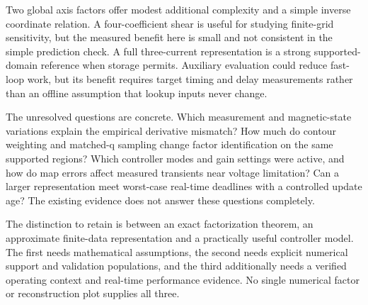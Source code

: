 Two global axis factors offer modest additional complexity and a simple inverse coordinate relation. A four-coefficient shear is useful for studying finite-grid sensitivity, but the measured benefit here is small and not consistent in the simple prediction check. A full three-current representation is a strong supported-domain reference when storage permits. Auxiliary evaluation could reduce fast-loop work, but its benefit requires target timing and delay measurements rather than an offline assumption that lookup inputs never change.

The unresolved questions are concrete. Which measurement and magnetic-state variations explain the empirical derivative mismatch? How much do contour weighting and matched-q sampling change factor identification on the same supported regions? Which controller modes and gain settings were active, and how do map errors affect measured transients near voltage limitation? Can a larger representation meet worst-case real-time deadlines with a controlled update age? The existing evidence does not answer these questions completely.

The distinction to retain is between an exact factorization theorem, an approximate finite-data representation and a practically useful controller model. The first needs mathematical assumptions, the second needs explicit numerical support and validation populations, and the third additionally needs a verified operating context and real-time performance evidence. No single numerical factor or reconstruction plot supplies all three.
